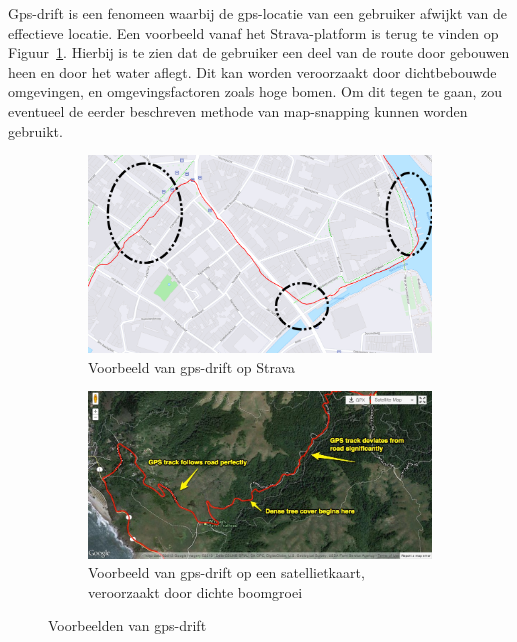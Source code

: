 Gps-drift is een fenomeen waarbij de \ac{gps}-locatie van een gebruiker afwijkt
van de effectieve locatie. Een voorbeeld vanaf het Strava-platform is terug te
vinden op Figuur~\ref{fig:gps_drift_Strava}. Hierbij is te zien dat de
gebruiker een deel van de route door gebouwen heen en door het water aflegt.
Dit kan worden veroorzaakt door dichtbebouwde omgevingen, en omgevingsfactoren
zoals hoge bomen. Om dit tegen te gaan, zou eventueel de eerder beschreven
methode van map-snapping kunnen worden gebruikt.
\begin{figure}[h]
    \centering
    \begin{subfigure}[b]{.45\textwidth}
        \centering
        \includegraphics[width=\textwidth]{fig/Afwijkingen&Analyses/Crooked Routes/GPS-drift.png}
        \caption{Voorbeeld van gps-drift op Strava}\label{fig:gps_drift_Strava}
    \end{subfigure}\hfill
    \begin{subfigure}[b]{.49\textwidth}
        \centering
        \includegraphics[width=\textwidth]{fig/Afwijkingen&Analyses/Crooked Routes/GPS-Drift_onlnie.jpg}
        \caption{Voorbeeld van gps-drift op een satellietkaart, veroorzaakt door dichte boomgroei\cite{BadGPSDa19:online}}
    \end{subfigure}
    \caption{Voorbeelden van gps-drift}
\end{figure}

